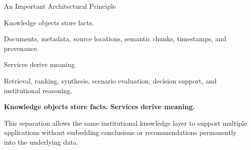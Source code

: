\documentclass[aspectratio=169]{beamer}
\begin{document}
\begin{frame}{An Important Architectural Principle}

\small

\begin{block}{Knowledge objects store facts.}

Documents, metadata, source locations, semantic chunks,
timestamps, and provenance.

\end{block}

\vspace{0.25cm}

\begin{block}{Services derive meaning.}

Retrieval, ranking, synthesis, scenario evaluation,
decision support, and institutional reasoning.

\end{block}

\vspace{0.35cm}

\begin{center}
\large
\textbf{Knowledge objects store facts. Services derive meaning.}
\end{center}

\vspace{0.25cm}

This separation allows the same institutional knowledge layer to
support multiple applications without embedding conclusions or
recommendations permanently into the underlying data.

\end{frame}
\end{document}
